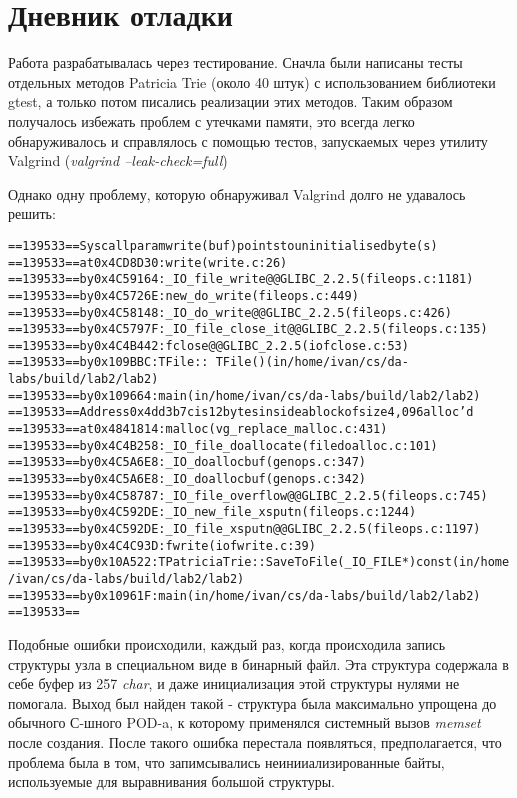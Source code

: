 \section{Дневник отладки}

Работа разрабатывалась через тестирование. Сначла были написаны тесты отдельных методов Patricia Trie (около 40 штук)
с использованием библиотеки gtest, а только потом писались реализации этих методов. Таким образом получалось избежать
проблем с утечками памяти, это всегда легко обнаруживалось и справлялось с помощью тестов, запускаемых через
утилиту Valgrind (\textit{valgrind --leak-check=full})

Однако одну проблему, которую обнаруживал Valgrind долго не удавалось решить:

\begin{alltt}
==139533== Syscall param write(buf) points to uninitialised byte(s)
==139533==    at 0x4CD8D30: write (write.c:26)
==139533==    by 0x4C59164: _IO_file_write@@GLIBC_2.2.5 (fileops.c:1181)
==139533==    by 0x4C5726E: new_do_write (fileops.c:449)
==139533==    by 0x4C58148: _IO_do_write@@GLIBC_2.2.5 (fileops.c:426)
==139533==    by 0x4C5797F: _IO_file_close_it@@GLIBC_2.2.5 (fileops.c:135)
==139533==    by 0x4C4B442: fclose@@GLIBC_2.2.5 (iofclose.c:53)
==139533==    by 0x109BBC: TFile::~TFile() (in /home/ivan/cs/da-labs/build/lab2/lab2)
==139533==    by 0x109664: main (in /home/ivan/cs/da-labs/build/lab2/lab2)
==139533==  Address 0x4dd3b7c is 12 bytes inside a block of size 4,096 alloc'd
==139533==    at 0x4841814: malloc (vg_replace_malloc.c:431)
==139533==    by 0x4C4B258: _IO_file_doallocate (filedoalloc.c:101)
==139533==    by 0x4C5A6E8: _IO_doallocbuf (genops.c:347)
==139533==    by 0x4C5A6E8: _IO_doallocbuf (genops.c:342)
==139533==    by 0x4C58787: _IO_file_overflow@@GLIBC_2.2.5 (fileops.c:745)
==139533==    by 0x4C592DE: _IO_new_file_xsputn (fileops.c:1244)
==139533==    by 0x4C592DE: _IO_file_xsputn@@GLIBC_2.2.5 (fileops.c:1197)
==139533==    by 0x4C4C93D: fwrite (iofwrite.c:39)
==139533==    by 0x10A522: TPatriciaTrie::SaveToFile(_IO_FILE*) const (in /home/ivan/cs/da-labs/build/lab2/lab2)
==139533==    by 0x10961F: main (in /home/ivan/cs/da-labs/build/lab2/lab2)
==139533== 
\end{alltt}

Подобные ошибки происходили, каждый раз, когда происходила запись структуры узла в специальном виде в бинарный файл.
Эта структура содержала в себе буфер из 257 \textit{char}, и даже инициализация этой структуры нулями не помогала.
Выход был найден такой - структура была максимально упрощена до обычного С-шного POD-a, к которому применялся системный вызов
\textit{memset} после создания. После такого ошибка перестала появляться, предполагается, что проблема была в том, что 
запимсывались неинииализированные байты, используемые для выравнивания большой структуры.

